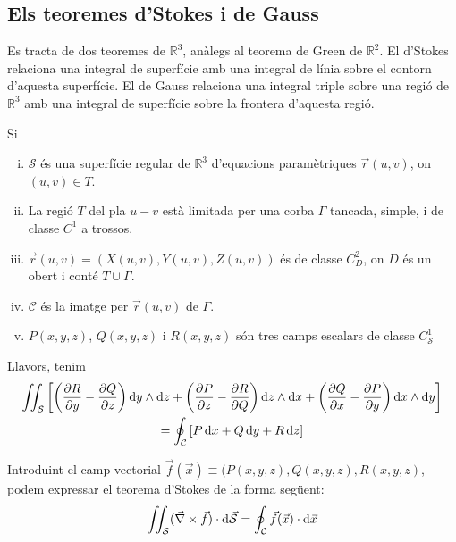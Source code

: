\subsection{Els teoremes d'Stokes i de Gauss}
Es tracta de dos teoremes de $\mathbb{R}^{3}$, anàlegs al teorema de Green de $\mathbb{R}^{2}$. El d'Stokes relaciona una integral de superfície amb una integral de línia sobre el contorn d'aquesta superfície. El de Gauss relaciona una integral triple sobre una regió de $\mathbb{R}^{3}$ amb una integral de superfície sobre la frontera d'aquesta regió.
\begin{thm}[d'Stokes]\label{thm:stokes}
	Si
	\begin{enumerate}[i)]
		\item $\mathcal{S}$ és una superfície regular de $\mathbb{R}^{3}$ d'equacions paramètriques $\vec{r}(u,v)$, on $(u,v) \in T$.
		\item La regió $T$ del pla $u-v$ està limitada per una corba $\Gamma$ tancada, simple, i de classe $C^{1}$ a trossos.
		\item $\vec{r}(u,v) = (X(u,v), Y(u,v), Z(u,v))$ és de classe $C^{2}_{D}$, on $D$ és un obert i conté $T \cup \Gamma$.
		\item $\mathcal{C}$ és la imatge per $\vec{r}(u,v)$ de $\Gamma$.
		\item $P(x,y,z)$, $Q(x,y,z)$ i $R(x,y,z)$ són tres camps escalars de classe $C^{1}_{\mathcal{S}}$
	\end{enumerate}
	Llavors, tenim
	\begin{align}
	\begin{gathered}
		\iint_{\mathcal{S}} \left[ \left( \frac{\partial R}{\partial y} - \frac{\partial Q}{\partial z} \right) \mathop{}\!\mathrm{d} y \wedge \mathrm{d} z + \left( \frac{\partial P}{\partial z} - \frac{\partial R}{\partial Q} \right) \mathop{}\!\mathrm{d} z \wedge \mathrm{d} x + \left( \frac{\partial Q}{\partial x} - \frac{\partial P}{\partial y} \right) \mathop{}\!\mathrm{d} x \wedge \mathrm{d} y \right] \\
		= \oint_{\mathcal{C}} \left[ P \mathop{}\!\mathrm{d} x + Q \mathop{}\!\mathrm{d} y + R \mathop{}\!\mathrm{d} z \right]
	\end{gathered}
	\end{align}
\end{thm}
Introduint el camp vectorial $\vec{f}(\vec{x}) \equiv (P(x,y,z), Q(x,y,z), R(x,y,z)$, podem expressar el teorema d'Stokes de la forma següent:
\begin{align}
	\iint_{\mathcal{S}} (\vec{\nabla} \times \vec{f}) \cdot \mathrm{d} \vec{\mathcal{S}} = \oint_{\mathcal{C}} \vec{f}(\vec{x}) \cdot \mathrm{d} \vec{x}
\end{align}

